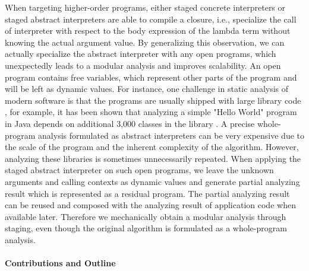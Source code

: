 When targeting higher-order programs, either staged concrete interpreters or
staged abstract interpreters are able to compile a closure, i.e., specialize the
call of interpreter with respect to the body expression of the lambda term
without knowing the actual argument value. By generalizing this observation, we
can actually specialize the abstract interpreter with any open programs, which
unexpectedly leads to a modular analysis and improves scalability. An open
program contains free variables, which represent other parts of the program and
will be left as dynamic values. For instance, one challenge in static analysis
of modern software is that the programs are usually shipped with large library
code \cite{toman_et_al:LIPIcs:2017:7121}, for example, it has been shown that
analyzing a simple "Hello World" program in Java depends on additional 3,000
classes in the library \cite{DBLP:conf/oopsla/KulkarniMZN16}. A precise
whole-program analysis formulated as abstract interpreters can be very expensive
due to the scale of the program and the inherent complexity of the algorithm.
However, analyzing these libraries is sometimes unnecessarily repeated. When
applying the staged abstract interpreter on such open programs, we leave the
unknown arguments and calling contexts as dynamic values and generate partial
analyzing result which is represented as a residual program. The partial
analyzing result can be reused and composed with the analyzing result of
application code when available later. Therefore we mechanically obtain a
modular analysis through staging, even though the original algorithm is
formulated as a whole-program analysis.

\iffalse
It has been observed that partially applying context-sensitivity on selected
portion of the program could improve the precision and efficiency
\cite{zipper2018, Kastrinis:2013:HCP:2491956.2462191}. We show that staging
abstract interpreters as an approach to effectively implement hybird
context-sensitivity\todo{}.
\fi


\paragraph{Contributions and Outline}

